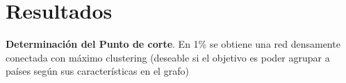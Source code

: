 \documentclass[compress]{beamer}
\begin{document}
\section{Resultados}


\begin{frame}

\scriptsize{
\textbf{Determinación del Punto de corte}. En 1\% se obtiene una red densamente conectada con máximo clustering (deseable si el objetivo es poder agrupar a países según sus características en el grafo)}

	\begin{figure}
		\centering

\end{figure}
\end{frame}
\end{document}
